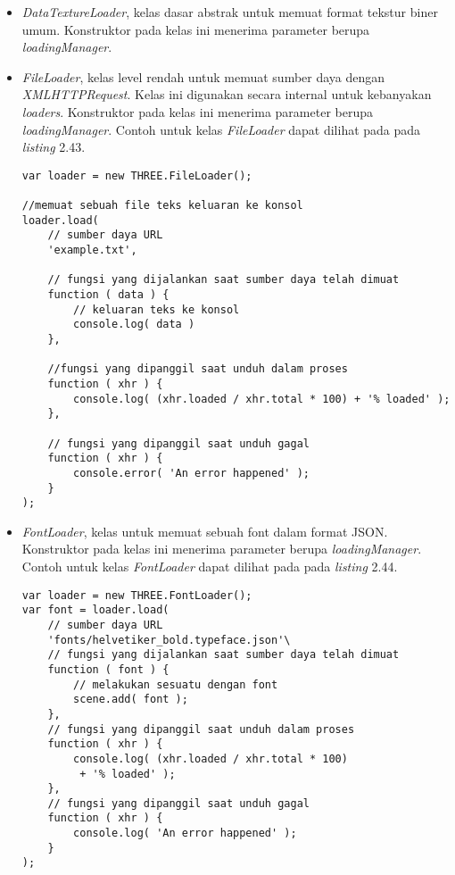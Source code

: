 \begin{itemize}
\begin{itemize}
	\item {\it DataTextureLoader}, kelas dasar abstrak untuk memuat format tekstur biner umum. Konstruktor pada kelas ini menerima parameter berupa  {\it loadingManager}.
	
	\item {\it FileLoader}, kelas level rendah untuk memuat sumber daya dengan {\it XMLHTTPRequest}. Kelas ini digunakan secara internal untuk kebanyakan {\it loaders}. Konstruktor pada kelas ini menerima parameter berupa  {\it loadingManager}. Contoh untuk kelas {\it FileLoader} dapat dilihat pada pada {\it listing} 2.43.
	
\begin{lstlisting}[caption={Contoh penggunaan kelas {\it FileLoader} untuk berkas dengan format TXT.},captionpos=b]
var loader = new THREE.FileLoader();

//memuat sebuah file teks keluaran ke konsol
loader.load(
    // sumber daya URL
    'example.txt',

    // fungsi yang dijalankan saat sumber daya telah dimuat
    function ( data ) {
        // keluaran teks ke konsol
        console.log( data )
    },

    //fungsi yang dipanggil saat unduh dalam proses
    function ( xhr ) {
        console.log( (xhr.loaded / xhr.total * 100) + '% loaded' );
    },

    // fungsi yang dipanggil saat unduh gagal
    function ( xhr ) {
        console.error( 'An error happened' );
    }
);

\end{lstlisting}

	\item {\it FontLoader}, kelas untuk memuat sebuah font dalam format JSON. Konstruktor pada kelas ini menerima parameter berupa  {\it loadingManager}. Contoh untuk kelas {\it FontLoader} dapat dilihat pada pada {\it listing} 2.44.
	
\begin{lstlisting}[caption={Contoh penggunaan kelas {\it FontLoader}.},captionpos=b]
var loader = new THREE.FontLoader();
var font = loader.load(
	// sumber daya URL
	'fonts/helvetiker_bold.typeface.json'\
	// fungsi yang dijalankan saat sumber daya telah dimuat
	function ( font ) {
		// melakukan sesuatu dengan font
		scene.add( font );
	},
	// fungsi yang dipanggil saat unduh dalam proses
	function ( xhr ) {
		console.log( (xhr.loaded / xhr.total * 100)
		 + '% loaded' );
	},
	// fungsi yang dipanggil saat unduh gagal
	function ( xhr ) {
		console.log( 'An error happened' );
	}
);
\end{lstlisting}


\end{itemize}
\end{itemize}
